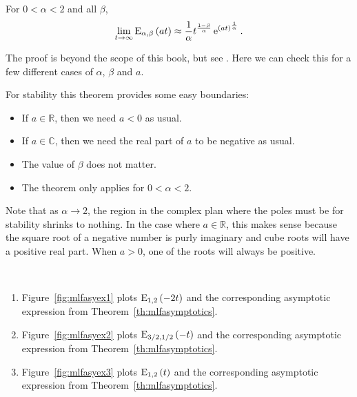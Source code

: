 \begin{theorem}
  For $0 < \alpha < 2$ and all $\beta$, 
  \begin{equation*}
    \lim_{ t \rightarrow \infty} \operatorname{E}_{\alpha,\beta} \left( a t \right) \approx \frac{1}{\alpha} t^{\frac{1-\beta}{\alpha}}\operatorname{e}^{\left( a t \right)^\frac{1}{\alpha}}.
  \end{equation*}
  \label{th:mlfasymptotics}
\end{theorem}

The proof is beyond the scope of this book, but see \cite{fraccontrol,mlfbook}. Here we can check this for a few different cases of $\alpha$, $\beta$ and $a$.

\begin{remark}
  For stability this theorem provides some easy boundaries:
  \begin{itemize}
  	\item If $a \in \mathbb R$, then we need $a < 0$ as usual.
  	\item If $a \in \mathbb C$, then we need the real part of $a$ to be negative as usual.
  	\item The value of $\beta$ does not matter.
	\item The theorem only applies for $0 < \alpha < 2$.
  \end{itemize}
  Note that as $\alpha \rightarrow 2$, the region in the complex plan where the poles must be for stability shrinks to nothing. In the case where $a \in \mathbb R$, this makes sense because the square root of a negative number is purly imaginary and cube roots will have a positive real part. When $a > 0$, one of the roots will always be positive.
\end{remark}

\begin{example} \hspace*{1in} \\
  \begin{enumerate}
    \item Figure~\ref{fig:mlfasyex1} plots $\operatorname{E}_{1,2}\left(-2 t \right)$ and the corresponding asymptotic expression from Theorem~\ref{th:mlfasymptotics}. 
    \item Figure~\ref{fig:mlfasyex2} plots $\operatorname{E}_{3/2,1/2}\left(-t \right)$ and the corresponding asymptotic expression from Theorem~\ref{th:mlfasymptotics}. 
    \item Figure~\ref{fig:mlfasyex3} plots $\operatorname{E}_{1,2}\left(t \right)$ and the corresponding asymptotic expression from Theorem~\ref{th:mlfasymptotics}. 
  \end{enumerate} 
\end{example}

